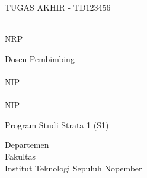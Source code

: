 \begin{large}
  TUGAS AKHIR - TD123456
\end{large}

\vspace{\fill}

\begin{spacing}{1.5}
  \begin{Large}
    \tatitle
  \end{Large}
\end{spacing}

\vspace{\fill}

\begin{large}
  \name{} \\
  \textmd{NRP \nrp{}}
\end{large}

\vspace{\fill}

\begin{large}
  \textmd{Dosen Pembimbing} \\
  \advisor{} \\
  \textmd{NIP \advisornip{}} \\
  \coadvisor{} \\
  \textmd{NIP \coadvisornip{}}
\end{large}

\vspace{\fill}

Program Studi Strata 1 (S1) \studyprogram{} \\

\mdseries

Departemen \department{} \\
Fakultas \faculty{} \\
Institut Teknologi Sepuluh Nopember

\place{} \\
\the\year{}

